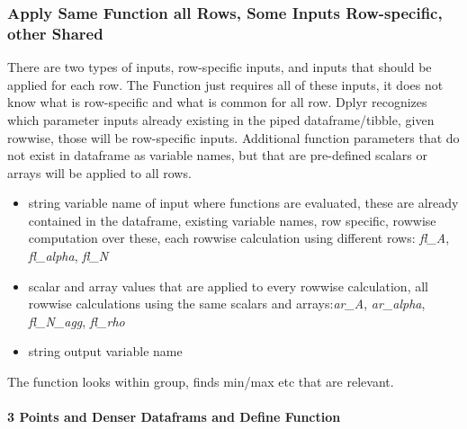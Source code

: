 \documentclass[
]{book}
\providecommand{\tightlist}{%
  \setlength{\itemsep}{0pt}\setlength{\parskip}{0pt}}
\begin{document}
\hypertarget{apply-same-function-all-rows-some-inputs-row-specific-other-shared}{%
\subsubsection{Apply Same Function all Rows, Some Inputs Row-specific, other Shared}\label{apply-same-function-all-rows-some-inputs-row-specific-other-shared}}

There are two types of inputs, row-specific inputs, and inputs that should be applied for each row. The Function just requires all of these inputs, it does not know what is row-specific and what is common for all row. Dplyr recognizes which parameter inputs already existing in the piped dataframe/tibble, given rowwise, those will be row-specific inputs. Additional function parameters that do not exist in dataframe as variable names, but that are pre-defined scalars or arrays will be applied to all rows.

\begin{itemize}
\tightlist
\item
  \citet{param} string variable name of input where functions are evaluated, these are already contained in the dataframe, existing variable names, row specific, rowwise computation over these, each rowwise calculation using different rows: \emph{fl\_A}, \emph{fl\_alpha}, \emph{fl\_N}
\item
  \citet{param} scalar and array values that are applied to every rowwise calculation, all rowwise calculations using the same scalars and arrays:\emph{ar\_A}, \emph{ar\_alpha}, \emph{fl\_N\_agg}, \emph{fl\_rho}
\item
  \citet{param} string output variable name
\end{itemize}

The function looks within group, finds min/max etc that are relevant.

\hypertarget{points-and-denser-dataframs-and-define-function}{%
\paragraph{3 Points and Denser Dataframs and Define Function}\label{points-and-denser-dataframs-and-define-function}}
\end{document}
